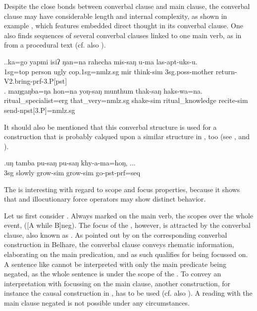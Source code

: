 Despite the close bonds between converbal clause and main clause, the converbal clause may have considerable length and internal complexity, as shown in example \Next[a], which features embedded direct thought in its converbal clause. One also finds sequences of several converbal clauses linked to one main verb, as in \Next[b] from a procedural text (cf. also \Last[b]).

	\ex.\ag.ka=go   yapmi isiʔ ŋan=na   rahecha mis-saŋ  u-ma    las-apt-uks-u.\\
	{\sc 1sg=top} person ugly   {\sc cop.1sg=nmlz.sg}  {\sc mir} think{\sc -sim} {\sc 3sg.poss-}mother   return{\sc -V2.bring-prf-3.P[pst]}\\
	 
	\bg. maŋgaŋba=ŋa   hon=na      yoŋ-saŋ     munthum   thak-saŋ   haks-wa=na.\\
		ritual\_specialist{\sc =erg} that\_very{\sc =nmlz.sg} shake{\sc -sim} ritual\_knowledge recite{\sc -sim} send{\sc -npst[3.P]=nmlz.sg}\\
		 
	
It should also be mentioned that this converbal structure is  used for a   construction that is probably calqued upon a similar structure in , too (see \Next, and ).

\exg.uŋ tamba  pu-saŋ     pu-saŋ    khy-a-ma=hoŋ,  ...\\
		{\sc 3sg} slowly grow{\sc -sim} grow{\sc -sim} go{\sc [3sg]-pst-prf=seq}\\
		 	


The  is interesting with regard to scope and focus properties, because it shows that  and illocutionary force operators may show distinct behavior. 

Let us first consider . Always marked on the main verb, the  scopes over the whole event, ([A while B]{\sc neg}). The focus of the , however, is attracted by the converbal clause, also known as  \citep{Horn1989A-natural}. As pointed out by \citet{Bickel1993Belhare} on the corresponding converbal construction in Belhare, the converbal clause conveys rhematic information, elaborating on the main predication, and as such qualifies for being focussed on. A sentence like \Next[a] cannot be interpreted with only the main predicate being  negated, as the whole sentence is under the  scope  of the . To convey an interpretation with  focussing on the main clause, another construction, for instance the causal construction in \Next[b], has to be used (cf. also \citealt{Bierkandtetal_Scope}). A reading with the main clause negated is not possible under any circumstances.

